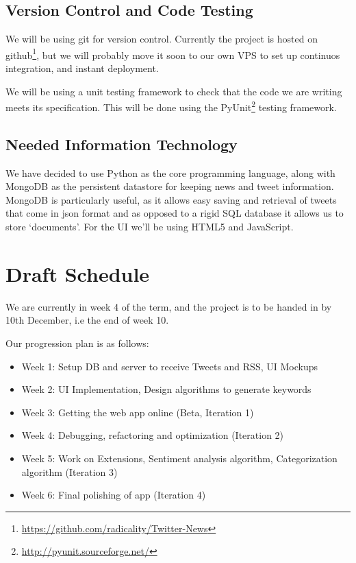 \documentclass[a4paper,11pt]{article}
\begin{document}
	
		\subsection{Version Control and Code Testing}
		
			We will be using git for version control. Currently the project is hosted on github\footnote{\url{https://github.com/radicality/Twitter-News}}, but we will probably move it soon to our own VPS to set up continuos integration, and instant deployment.
			
			We will be using a unit testing framework to check that the code we are writing meets its specification. This will be done using the PyUnit\footnote{\url{http://pyunit.sourceforge.net/}} testing framework.
			
			
		\subsection{Needed Information Technology}
			We have decided to use Python as the core programming language, along with MongoDB as the persistent datastore for keeping news and tweet information. MongoDB is particularly useful, as it allows easy saving and retrieval of tweets that come in json format and as opposed to a rigid SQL database it allows us to store `documents'. For the UI we'll be using HTML5 and JavaScript.
			
	
	\section{Draft Schedule}
	
		We are currently in week 4 of the term, and the project is to be handed in by 10th December, i.e the end of week 10.
		
		Our progression plan is as follows:
		
		\begin{itemize}
			\item Week 1: Setup DB and server to receive Tweets and RSS, UI Mockups
			\item Week 2: UI Implementation, Design algorithms to generate keywords
			\item Week 3: Getting the web app online (Beta, Iteration 1)
			\item Week 4: Debugging, refactoring and optimization (Iteration 2)
			\item Week 5: Work on Extensions, Sentiment analysis algorithm, Categorization algorithm (Iteration 3)
			\item Week 6: Final polishing of app (Iteration 4)
		\end{itemize}
	
\end{document}
